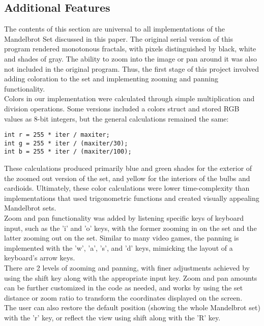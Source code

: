 \documentclass{article}
\begin{document}
\subsection{Additional Features}

The contents of this section are universal to all implementations of the 
Mandelbrot Set discussed in this paper.
The original serial version of this program rendered monotonous fractals, 
with pixels distinguished by black, white and shades of gray.
The ability to zoom into the image or pan around it was also not included 
in the original program.
Thus, the first stage of this project involved adding coloration to the set
and implementing zooming and panning functionality.\\

Colors in our implementation were calculated through simple multiplication
and division operations.
Some versions included a colors struct and stored RGB values as 8-bit 
integers, but the general calculations remained the same:

\begin{verbatim}
int r = 255 * iter / maxiter;
int g = 255 * iter / (maxiter/30);
int b = 255 * iter / (maxiter/100);
\end{verbatim}

These calculations produced primarily blue and green shades for the 
exterior of the zoomed out version of the set, and yellow for the interiors
of the bulbs and cardioids.
Ultimately, these color calculations were lower time-complexity than 
implementations that used trigonometric functions and created visually
appealing Mandelbrot sets.\\

Zoom and pan functionality was added by listening specific keys of keyboard
input, such as the 'i' and 'o' keys, with the former zooming in on the set
and the latter zooming out on the set.
Similar to many video games, the panning is implemented with the 'w', 'a',
's', and 'd' keys, mimicking the layout of a keyboard's arrow keys.\\

There are 2 levels of zooming and panning, with finer adjustments achieved
by using the shift key along with the appropriate input key.
Zoom and pan amounts can be further customized in the code as needed, and 
works by using the set distance or zoom ratio to transform the coordinates 
displayed on the screen.\\

The user can also restore the default position (showing the whole 
Mandelbrot set) with the 'r' key, or reflect the view using shift along
with the 'R' key.
\end{document}
